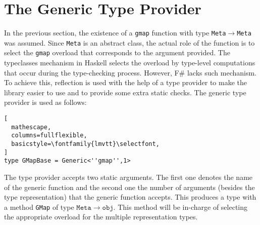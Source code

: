 \documentclass{sigplanconf}
\begin{document}
\section{The Generic Type Provider}
\label{sec:conversion}
In the previous section, the existence of a \verb+gmap+ function with
type \verb+Meta+$\to$\verb+Meta+ was assumed. Since \verb+Meta+ is an
abstract class, the actual role of the function is to select the
\verb+gmap+ overload that corresponds to the argument provided. The
typeclasses mechanism in Haskell selects the overload by type-level
computations that occur during the type-checking process. However, F\#
lacks such mechanism. To achieve this, reflection is used with the
help of a type provider to make the library easier to use and to
provide some extra static checks. The generic type provider is used as
follows:
\begin{lstlisting}[
  mathescape,
  columns=fullflexible,
  basicstyle=\fontfamily{lmvtt}\selectfont,
]
type GMapBase = Generic<''gmap'',1>
\end{lstlisting}
The type provider accepts two static arguments. The first one denotes
the name of the generic function and the second one the number of
arguments (besides the type representation) that the generic function
accepts. This produces a type with a method \verb+GMap+ of type
$\mathtt{Meta} \to \mathtt{obj}$. This method will be in-charge of
selecting the appropriate overload for the multiple representation
types.
\end{document}

